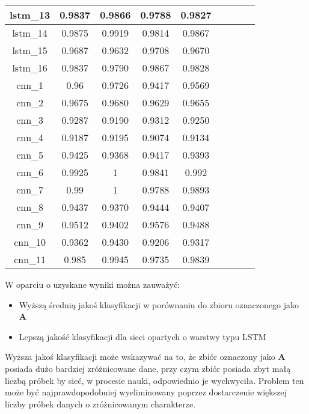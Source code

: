 \begin{table}[p]
\begin{tabular} {|c|c|c|c|c|c|c|c|c| }
        lstm\_13 & 0.9837                       & 0.9866    & 0.9788 & 0.9827 \\ \hline
        lstm\_14 & 0.9875                       & 0.9919    & 0.9814 & 0.9867 \\ \hline
        lstm\_15 & 0.9687                       & 0.9632    & 0.9708 & 0.9670 \\ \hline
        lstm\_16 & 0.9837                       & 0.9790    & 0.9867 & 0.9828 \\ \hline
        cnn\_1   & 0.96                         & 0.9726    & 0.9417 & 0.9569 \\ \hline
        cnn\_2   & 0.9675                       & 0.9680    & 0.9629 & 0.9655 \\ \hline
        cnn\_3   & 0.9287                       & 0.9190    & 0.9312 & 0.9250 \\ \hline
        cnn\_4   & 0.9187                       & 0.9195    & 0.9074 & 0.9134 \\ \hline
        cnn\_5   & 0.9425                       & 0.9368    & 0.9417 & 0.9393 \\ \hline
        cnn\_6   & 0.9925                       & 1         & 0.9841 & 0.992  \\ \hline
        cnn\_7   & 0.99                         & 1         & 0.9788 & 0.9893 \\ \hline
        cnn\_8   & 0.9437                       & 0.9370    & 0.9444 & 0.9407 \\ \hline
        cnn\_9   & 0.9512                       & 0.9402    & 0.9576 & 0.9488 \\ \hline
        cnn\_10  & 0.9362                       & 0.9430    & 0.9206 & 0.9317 \\ \hline
        cnn\_11  & 0.985                        & 0.9945    & 0.9735 & 0.9839 \\ \hline
    \end{tabular}
\end{table}

W oparciu o uzyskane wyniki można zauważyć:

\begin{itemize}
    \item Wyższą średnią jakoś klasyfikacji w porównaniu do zbioru oznaczonego jako \textbf{A}
    \item Lepszą jakość klasyfikacji dla sieci opartych o warstwy typu LSTM
\end{itemize}


Wyższa jakoś klasyfikacji może wskazywać na to, że zbiór oznaczony jako \textbf{A} posiada dużo bardziej zróżnicowane dane, przy czym zbiór posiada zbyt małą liczbą próbek by sieć, w procesie nauki, odpowiednio je wychwyciła. Problem ten może być najprawdopodobniej wyeliminowany poprzez dostarczenie większej liczby próbek danych o zróżnicowanym charakterze.

